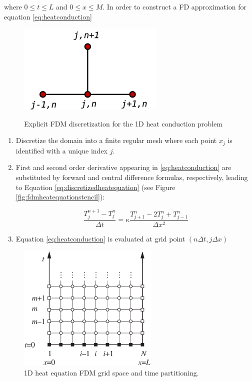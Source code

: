     where $0 \leq t \leq L$ and $0 \leq x \leq
    M$. 
 In order to construct a FD approximation for equation \ref{eq:heatconduction} 
 
 \begin{figure}[b]
 	\centering
 	\includegraphics[scale=0.5]{./images/CA_FDM/heatstencil}
 	\label{fig:fdmheatequationstencil}
 	\caption{Explicit FDM discretization for the 1D heat conduction problem}\label{torus}
 \end{figure}   
 
 \begin{enumerate}
 
 \item Discretize the domain into a finite regular mesh where each point $x_j$ is identified with a unique index $j$.
    
 \item  First and second order derivative appearing in \ref{eq:heatconduction} are substituted by forward and central difference formulas, respectively, leading to Equation \ref{eq:discretizedheatequation} (see Figure  \ref{fig:fdmheatequationstencil}):
 
 \begin{equation}
  \frac{T^{n+1}_{j} - T^n_{j}}{\Delta t} = \kappa \frac{T^n_{j+1}- 2T^n_{j} + T^n_{j-1}}{\Delta x^2}
 \label{eq:discretizedheatequation}
 \end{equation}
 
 \item Equation \ref{eq:heatconduction} is evaluated at grid point $(n\Delta t, j \Delta x)$ 
    
\end{enumerate}    
    

    
\begin{figure}
\centering
\includegraphics[width=0.6\textwidth]{./images/CA_FDM/fdmgrid}
\caption{1D heat equation FDM grid space and time partitioning.}\label{torus}
\end{figure}

